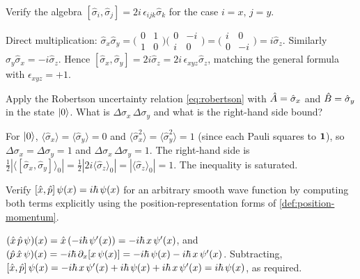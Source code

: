 \begin{exercise}
Verify the algebra $[\hat\sigma_i,\hat\sigma_j]=2i\,\epsilon_{ijk}\hat\sigma_k$
for the case $i=x,\,j=y$.
\begin{solution}
Direct multiplication:
$\hat\sigma_x\hat\sigma_y=
\bigl(\begin{smallmatrix}0&1\\1&0\end{smallmatrix}\bigr)
\bigl(\begin{smallmatrix}0&-i\\i&0\end{smallmatrix}\bigr)
=\bigl(\begin{smallmatrix}i&0\\0&-i\end{smallmatrix}\bigr)
=i\hat\sigma_z$.
Similarly $\hat\sigma_y\hat\sigma_x=-i\hat\sigma_z$. Hence
$[\hat\sigma_x,\hat\sigma_y]=2i\hat\sigma_z=2i\,\epsilon_{xyz}\hat\sigma_z$,
matching the general formula with $\epsilon_{xyz}=+1$.
\end{solution}
\end{exercise}

\begin{exercise}
Apply the Robertson uncertainty relation \cref{eq:robertson} with
$\hat{A}=\hat\sigma_x$ and $\hat{B}=\hat\sigma_y$ in the state
$\ket{0}$. What is $\Delta\sigma_x\,\Delta\sigma_y$ and what is
the right-hand side bound?
\begin{solution}
For $\ket{0}$, $\langle\hat\sigma_x\rangle=\langle\hat\sigma_y\rangle=0$
and $\langle\hat\sigma_x^2\rangle=\langle\hat\sigma_y^2\rangle=1$
(since each Pauli squares to $\mathbf{1}$), so
$\Delta\sigma_x=\Delta\sigma_y=1$ and $\Delta\sigma_x\,\Delta\sigma_y=1$.
The right-hand side is
$\tfrac12|\langle[\hat\sigma_x,\hat\sigma_y]\rangle_0|=\tfrac12|2i\langle\hat\sigma_z\rangle_0|
=|\langle\hat\sigma_z\rangle_0|=1$. The inequality is saturated.
\end{solution}
\end{exercise}

\begin{exercise}
Verify $[\hat{x},\hat{p}]\,\psi(x)=i\hbar\,\psi(x)$ for an arbitrary
smooth wave function by computing both terms explicitly using
the position-representation forms of \cref{def:position-momentum}.
\begin{solution}
$(\hat{x}\,\hat{p}\,\psi)(x)=\hat{x}\,(-i\hbar\,\psi'(x))=-i\hbar\,x\,\psi'(x)$,
and
$(\hat{p}\,\hat{x}\,\psi)(x)=-i\hbar\,\partial_x[x\,\psi(x)]
=-i\hbar\,\psi(x)-i\hbar\,x\,\psi'(x)$.
Subtracting,
$[\hat{x},\hat{p}]\,\psi(x)=-i\hbar\,x\,\psi'(x)+i\hbar\,\psi(x)+i\hbar\,x\,\psi'(x)
=i\hbar\,\psi(x)$, as required.
\end{solution}
\end{exercise}

